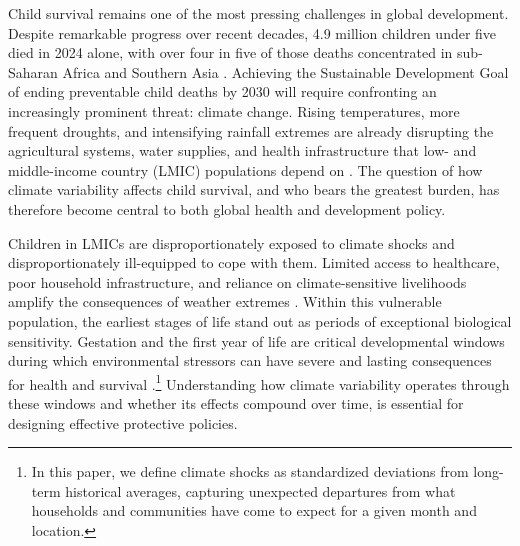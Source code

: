 \documentclass[a4paper]{article}
\begin{document}
Child survival remains one of the most pressing challenges in global development. Despite remarkable progress over recent decades, 4.9 million children under five died in 2024 alone, with over four in five of those deaths concentrated in sub-Saharan Africa and Southern Asia \parencite{UNIGME2025}. Achieving the Sustainable Development Goal of ending preventable child deaths by 2030 will require confronting an increasingly prominent threat: climate change. Rising temperatures, more frequent droughts, and intensifying rainfall extremes are already disrupting the agricultural systems, water supplies, and health infrastructure that low- and middle-income country (LMIC) populations depend on \parencite{watts2018lancet}. The question of how climate variability affects child survival, and who bears the greatest burden, has therefore become central to both global health and development policy.

Children in LMICs are disproportionately exposed to climate shocks and disproportionately ill-equipped to cope with them. Limited access to healthcare, poor household infrastructure, and reliance on climate-sensitive livelihoods amplify the consequences of weather extremes \parencite{UNICEF2015}. Within this vulnerable population, the earliest stages of life stand out as periods of exceptional biological sensitivity. Gestation and the first year of life are critical developmental windows during which environmental stressors can have severe and lasting consequences for health and survival \parencite{adger2006fair}.\footnote{In this paper, we define climate shocks as standardized deviations from long-term historical averages, capturing unexpected departures from what households and communities have come to expect for a given month and location.} Understanding how climate variability operates through these windows and whether its effects compound over time, is essential for designing effective protective policies.
\end{document}
